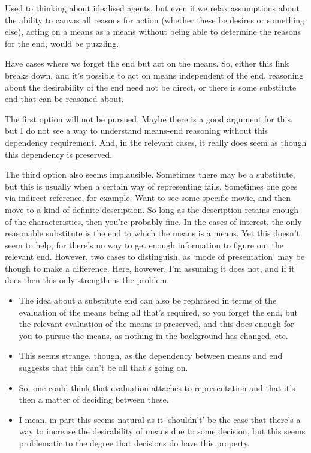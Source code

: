 \documentclass[10pt]{article}
\begin{document}
Used to thinking about idealised agents, but even if we relax assumptions about the ability to canvas all reasons for action (whether these be desires or something else), acting on a means as a means without being able to determine the reasons for the end, would be puzzling.

Have cases where we forget the end but act on the means.
So, either this link breaks down, and it's possible to act on means independent of the end, reasoning about the desirability of the end need not be direct, or there is some substitute end that can be reasoned about.

The first option will not be pursued.
Maybe there is a good argument for this, but I do not see a way to understand means-end reasoning without this dependency requirement.
And, in the relevant cases, it really does seem as though this dependency is preserved.

The third option also seems implausible.
Sometimes there may be a substitute, but this is usually when a certain way of representing fails.
Sometimes one goes via indirect reference, for example.
Want to see some specific movie, and then move to a kind of definite description.
So long as the description retains enough of the characteristics, then you're probably fine.
In the cases of interest, the only reasonable substitute is the end to which the means is a means.
Yet this doesn't seem to help, for there's no way to get enough information to figure out the relevant end.
However, two cases to distinguish, as `mode of presentation' may be though to make a difference.
Here, however, I'm assuming it does not, and if it does then this only strengthens the problem.
\begin{itemize}
\item The idea about a substitute end can also be rephrased in terms of the evaluation of the means being all that's required, so you forget the end, but the relevant evaluation of the means is preserved, and this does enough for you to pursue the means, as nothing in the background has changed, etc.
\item This seems strange, though, as the dependency between means and end suggests that this can't be all that's going on.
\item So, one could think that evaluation attaches to representation and that it's then a matter of deciding between these.
\item I mean, in part this seems natural as it `shouldn't' be the case that there's a way to increase the desirability of means due to some decision, but this seems problematic to the degree that decisions do have this property.
\end{itemize}
\end{document}

